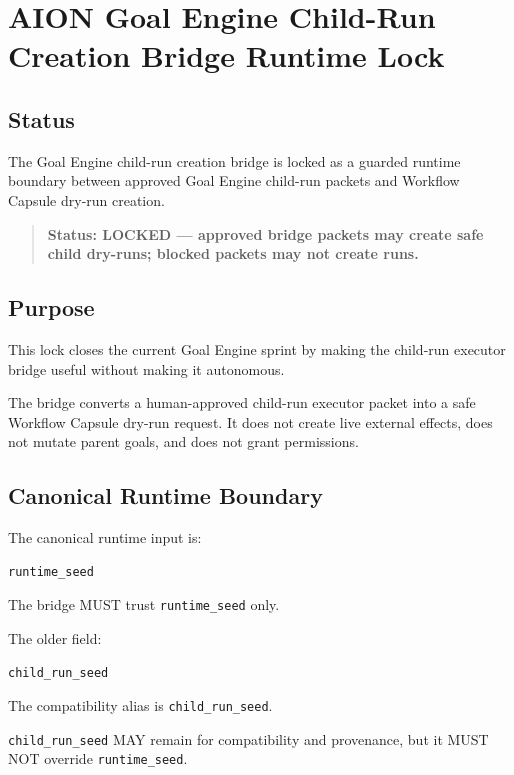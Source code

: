\section{AION Goal Engine Child-Run Creation Bridge Runtime Lock}
\label{sec:aion-goal-engine-child-run-creation-bridge-runtime-lock}

\subsection{Status}

The Goal Engine child-run creation bridge is locked as a guarded runtime boundary between approved Goal Engine child-run packets and Workflow Capsule dry-run creation.

\begin{quote}
\textbf{Status: LOCKED --- approved bridge packets may create safe child dry-runs; blocked packets may not create runs.}
\end{quote}

\subsection{Purpose}

This lock closes the current Goal Engine sprint by making the child-run executor bridge useful without making it autonomous.

The bridge converts a human-approved child-run executor packet into a safe Workflow Capsule dry-run request. It does not create live external effects, does not mutate parent goals, and does not grant permissions.

\subsection{Canonical Runtime Boundary}

The canonical runtime input is:

\begin{verbatim}
runtime_seed
\end{verbatim}

The bridge MUST trust \texttt{runtime\_seed} only.

The older field:

\begin{verbatim}
child_run_seed
\end{verbatim}

The compatibility alias is \texttt{child\_run\_seed}.

\texttt{child\_run\_seed} MAY remain for compatibility and provenance, but it MUST NOT override \texttt{runtime\_seed}.


